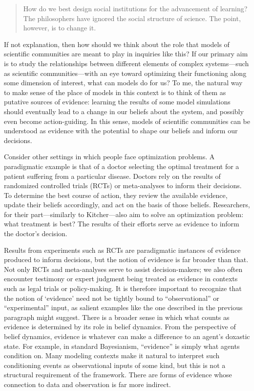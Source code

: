 \documentclass{article}
\begin{document}
\begin{quote}

    How do we best design social institutions for the advancement of learning? The philosophers have ignored the social structure of science. The point, however, is to change it.\cite[p.22]{Kitcher1990-KITTDO}

\end{quote}

If not explanation, then how should we think about the role that models of scientific communities are meant to play in inquiries like this? If our primary aim is to study the relationships between different elements of complex systems—such as scientific communities—with an eye toward optimizing their functioning along some dimension of interest, what can models do for us? To me, the natural way to make sense of the place of models in this context is to think of them as putative sources of evidence: learning the results of some model simulations should eventually lead to a change in our beliefs about the system, and possibly even become action-guiding. In this sense, models of scientific communities can be understood as evidence with the potential to shape our beliefs and inform our decisions.

Consider other settings in which people face optimization problems. A paradigmatic example is that of a doctor selecting the optimal treatment for a patient suffering from a particular disease. Doctors rely on the results of randomized controlled trials (RCTs) or meta-analyses to inform their decisions. To determine the best course of action, they review the available evidence, update their beliefs accordingly, and act on the basis of those beliefs. Researchers, for their part—similarly to Kitcher—also aim to solve an optimization problem: what treatment is best? The results of their efforts serve as evidence to inform the doctor's decision.

Results from experiments such as RCTs are paradigmatic instances of evidence produced to inform decisions, but the notion of evidence is far broader than that. Not only RCTs and meta-analyses serve to assist decision-makers; we also often encounter testimony or expert judgment being treated as evidence in contexts such as legal trials or policy-making. It is therefore important to recognize that the notion of `evidence' need not be tightly bound to ``observational'' or ``experimental'' input, as salient examples like the one described in the previous paragraph might suggest. There is a broader sense in which what counts as evidence is determined by its role in belief dynamics. From the perspective of belief dynamics, evidence is whatever can make a difference to an agent's doxastic state. For example, in standard Bayesianism, ``evidence'' is simply what agents condition on. Many modeling contexts make it natural to interpret such conditioning events as observational inputs of some kind, but this is not a structural requirement of the framework. There are forms of evidence whose connection to data and observation is far more indirect.
\end{document}
